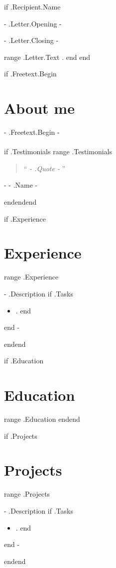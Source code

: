 \documentclass[10pt,a4paper,sans]{moderncv}
\newcommand{\chapquote}[2]{\begin{quotation} \enquote{\textit{#1}} \end{quotation} \begin{flushright} - #2\end{flushright} }
\begin{document}
{{if .Recipient.Name}}
  \date{ {{- .Letter.Date -}} }
  \opening{ {{- .Letter.Opening -}} }
  \closing{ {{- .Letter.Closing -}} }
  \makelettertitle
  {{range .Letter.Text}}
    {{.}}
  {{end}}
  \makeletterclosing
  \pagebreak
{{end}}


\makecvtitle

{{if .Freetext.Begin}}\section{About me}
{{- .Freetext.Begin -}}
\\~\\
{{if .Testimonials}}
{{range .Testimonials}}\chapquote{ {{- .Quote -}} }{ {{- .Name -}} }
{{end}}{{end}}{{end}}


{{if .Experience}}\section{Experience}
{{range .Experience}}
{ {{- .Description}} 
  {{if .Tasks}}\begin{itemize}
    {{range .Tasks}} \item {{.}}
    {{end}}\end{itemize}
  {{end -}} }
{{end}}{{end}}

{{if .Education}}\section{Education}
{{range .Education}}
{{end}}{{end}}

{{if .Projects}}\section{Projects}
{{range .Projects}}
{ {{- .Description}} 
  {{if .Tasks}}\begin{itemize}
    {{range .Tasks}} \item {{.}}
    {{end}}\end{itemize}
  {{end -}} }
{{end}}{{end}}
\end{document}
